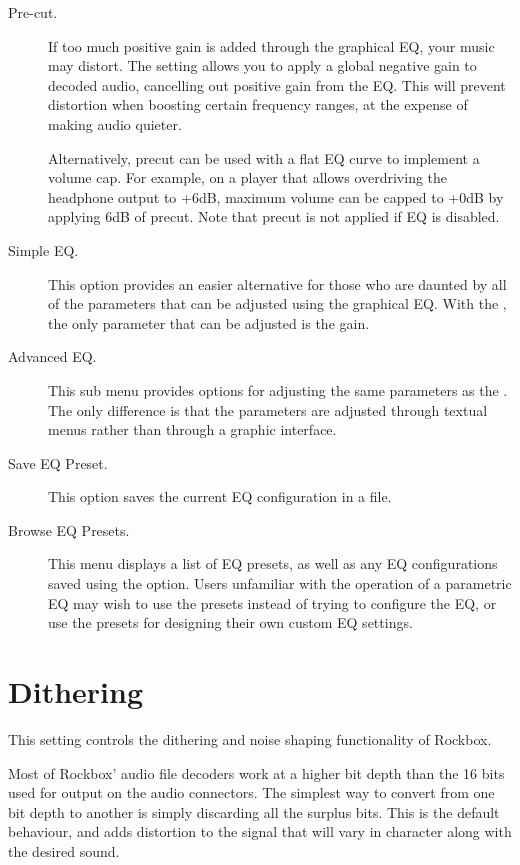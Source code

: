\begin {description}
  \item[Pre-cut.]
  If too much positive gain is added through the graphical EQ, your music may
  distort.  The  setting allows you to apply a global negative
  gain to decoded audio, cancelling out positive gain from the EQ.  This will
  prevent distortion when boosting certain frequency ranges, at the expense of
  making audio quieter.

  Alternatively, precut can be used with a flat EQ curve to implement a volume
  cap.  For example, on a player that allows overdriving the headphone output
  to +6dB, maximum volume can be capped to +0dB by applying 6dB of precut. Note
  that precut is not applied if EQ is disabled.

\item[Simple EQ.]
This option provides an easier alternative for those who are daunted by all of
the parameters that can be adjusted using the graphical EQ. With the
, the only parameter that can be adjusted is the gain.

\item[Advanced EQ.]
This sub menu provides options for adjusting the same parameters as the
. The only difference is that the parameters are
adjusted through textual menus rather than through a graphic interface.

\item[Save EQ Preset.]
This option saves the current EQ configuration in a  file.

\item[Browse EQ Presets.]
This menu displays a list of EQ presets, as well as any EQ configurations saved
using the  option. Users unfamiliar with the
operation of a parametric EQ may wish to use the presets instead of trying to
configure the EQ, or use the presets for designing their own custom EQ
settings.

\end{description}

\section{Dithering}
This setting controls the dithering and noise shaping functionality of Rockbox.

Most of Rockbox' audio file decoders work at a higher bit depth than the 16 bits
used for output on the \daps{} audio connectors. The simplest way to
convert from one bit depth to another is simply discarding all the surplus bits.
This is the default behaviour, and adds distortion to the signal that will
vary in character along with the desired sound.

